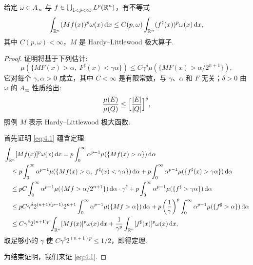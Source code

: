 \begin{theorem}\label{thm:4.19}
给定 $\omega \in A_\infty$ 与 $f \in \bigcup_{1<p<\infty} L^p(\mathbb{R}^n)$，有不等式
\begin{align*}
  \int_{\mathbb{R}^{n}}(M f(x))^{p}\omega(x)\,\mathrm{d}x
  \leq C(p,\omega)\int_{\mathbb{R}^{n}}(f^{\sharp}(x))^{p}\omega(x)\,\mathrm{d}x,
\end{align*}
其中 $C(p, \omega) < \infty$，$M$ 是 Hardy--Littlewood 极大算子.
\end{theorem}

\begin{proof}
证明将基于下列估计:
\begin{equation}\label{eq:4.1}
  \mu(\{M F(x)>\alpha,\;F^{\sharp}(x)<\gamma\alpha\})
  \leq C\gamma^{\delta}\mu(\{M F(x)>\alpha/2^{n+1}\}),
\end{equation}
它对每个 $\gamma, \alpha > 0$ 成立，其中 $C < \infty$ 是有限常数，与 $\gamma$、$\alpha$ 和 $F$ 无关；$\delta > 0$ 由 $\omega$ 的 $A_\infty$ 性质给出:
\begin{align*}
  \frac{\mu(E)}{\mu(Q)}\leq\Bigl[\frac{|E|}{|Q|}\Bigr]^{\delta},
\end{align*}
照例 $M$ 表示 Hardy--Littlewood 极大函数.

首先证明 \eqref{eq:4.1} 蕴含定理:
\begin{align*}
  &\int_{\mathbb{R}^{n}}[Mf(x)]^{p}\omega(x)\,\mathrm{d}x
  =p\int_{0}^{\infty}\alpha^{p-1}\mu(\{Mf(x)>\alpha\})\,\mathrm{d}\alpha\\
  &\quad\leq p\int_{0}^{\infty}\alpha^{p-1}\mu(\{Mf(x)>\alpha,\;f^{\sharp}(x)<\gamma\alpha\})\,\mathrm{d}\alpha
   +p\int_{0}^{\infty}\alpha^{p-1}\mu(\{f^{\sharp}(x)>\gamma\alpha\})\,\mathrm{d}\alpha\\
  &\quad\leq pC\int_{0}^{\infty}\alpha^{p-1}\mu(\{Mf>\alpha/2^{n+1}\})\,\mathrm{d}\alpha\cdot\gamma^{\delta}
   +p\int_{0}^{\infty}\alpha^{p-1}\mu(\{f^{\sharp}>\gamma\alpha\})\,\mathrm{d}\alpha\\
  &\quad\leq pC\gamma^{\delta}2^{(n+1)(p-1)}2^{n+1}\int_{0}^{\infty}\alpha^{p-1}\mu(\{Mf>\alpha\})\,\mathrm{d}\alpha
   +p\left(\frac{1}{\gamma}\right)^{p}\int_{0}^{\infty}\alpha^{p-1}\mu(\{f^{\sharp}>\alpha\})\,\mathrm{d}\alpha\\
  &\quad\leq C\gamma^{\delta}2^{(n+1)p}\int_{\mathbb{R}^{n}}[Mf(x)]^{p}\omega(x)\,\mathrm{d}x
   +\frac{1}{\gamma^{p}}\int_{\mathbb{R}^{n}}[f^{\sharp}(x)]^{p}\omega(x)\,\mathrm{d}x,
\end{align*}
取足够小的 $\gamma$ 使 $C\gamma^{\delta}2^{(n+1)p} \leq 1/2$，即得定理.

为结束证明，我们来证 \eqref{eq:4.1}.


\end{proof}
